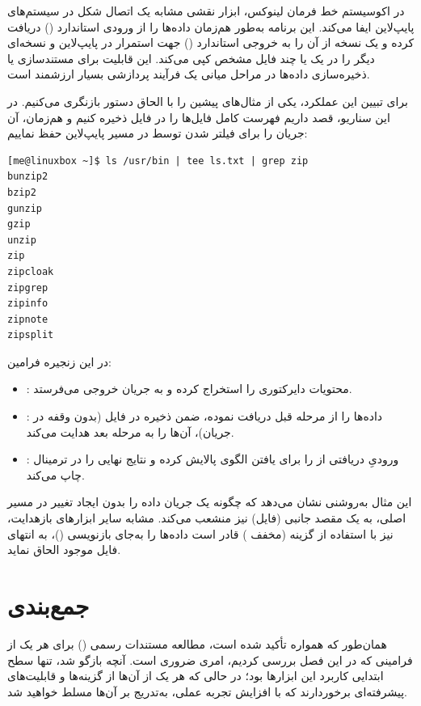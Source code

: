 در اکوسیستم خط فرمان لینوکس، ابزار  نقشی مشابه یک اتصال  شکل در سیستم‌های پایپ‌لاین ایفا می‌کند. این برنامه به‌طور هم‌زمان داده‌ها را از ورودی استاندارد () دریافت کرده و یک نسخه از آن را به خروجی استاندارد () جهت استمرار در پایپ‌لاین و نسخه‌ای دیگر را در یک یا چند فایل مشخص کپی می‌کند. این قابلیت برای مستندسازی یا ذخیره‌سازی داده‌ها در مراحل میانی یک فرآیند پردازشی بسیار ارزشمند است.

برای تبیین این عملکرد، یکی از مثال‌های پیشین را با الحاق دستور  بازنگری می‌کنیم. در این سناریو، قصد داریم فهرست کامل فایل‌ها را در فایل  ذخیره کنیم و هم‌زمان، آن جریان را برای فیلتر شدن توسط  در مسیر پایپ‌لاین حفظ نماییم:

\begin{latin}
\begin{lstlisting}
[me@linuxbox ~]$ ls /usr/bin | tee ls.txt | grep zip
bunzip2
bzip2
gunzip
gzip
unzip
zip
zipcloak
zipgrep
zipinfo
zipnote
zipsplit
\end{lstlisting}
\end{latin}

در این زنجیره فرامین:

\begin{itemize}
  \item {}: محتویات دایرکتوری را استخراج کرده و به جریان خروجی می‌فرستد.
  \item {}: داده‌ها را از مرحله قبل دریافت نموده، ضمن ذخیره در فایل  (بدون وقفه در جریان)، آن‌ها را به مرحله بعد هدایت می‌کند.
  \item {}: ورودیِ دریافتی از  را برای یافتن الگوی  پالایش کرده و نتایج نهایی را در ترمینال چاپ می‌کند.
\end{itemize}

این مثال به‌روشنی نشان می‌دهد که  چگونه یک جریان داده را بدون ایجاد تغییر در مسیر اصلی، به یک مقصد جانبی (فایل) نیز منشعب می‌کند. مشابه سایر ابزارهای بازهدایت،  نیز با استفاده از گزینه  (مخفف ) قادر است داده‌ها را به‌جای بازنویسی ()، به انتهای فایل موجود الحاق نماید.

\section{جمع‌بندی}

همان‌طور که همواره تأکید شده است، مطالعه مستندات رسمی () برای هر یک از فرامینی که در این فصل بررسی کردیم، امری ضروری است. آنچه بازگو شد، تنها سطح ابتدایی کاربرد این ابزارها بود؛ در حالی که هر یک از آن‌ها از گزینه‌ها و قابلیت‌های پیشرفته‌ای برخوردارند که با افزایش تجربه عملی، به‌تدریج بر آن‌ها مسلط خواهید شد.

